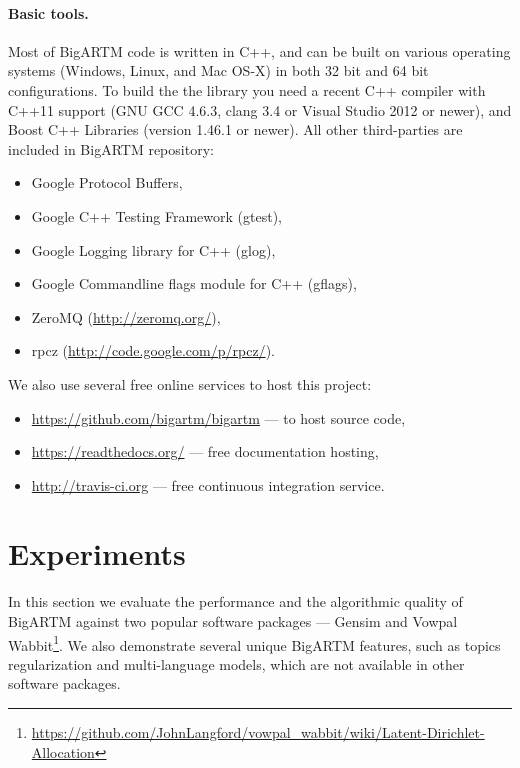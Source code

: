 \documentclass{llncs}
\begin{document}
\paragraph{Basic tools.}
Most of BigARTM code is written in C++,
and can be built on various operating systems (Windows, Linux, and Mac OS-X)
in both 32 bit and 64 bit configurations.
To build the the library you need a recent C++ compiler with C++11 support (GNU GCC 4.6.3, clang 3.4 or Visual Studio 2012 or newer),
and Boost C++ Libraries (version 1.46.1 or newer).
All other third-parties are included in BigARTM repository:
\begin{itemize}
\item Google Protocol Buffers,
\item Google C++ Testing Framework (gtest),
\item Google Logging library for C++ (glog),
\item Google Commandline flags module for C++ (gflags),
\item ZeroMQ (\url{http://zeromq.org/}),
\item rpcz (\url{http://code.google.com/p/rpcz/}).
\end{itemize}
We also use several free online services to host this project:
\begin{itemize}
\item \url{https://github.com/bigartm/bigartm} --- to host source code,
\item \url{https://readthedocs.org/} --- free documentation hosting,
\item \url{http://travis-ci.org} --- free continuous integration service.
\end{itemize}

\section{Experiments}
\label{sec:Experiments}

In this section we evaluate the performance and the algorithmic quality of \mbox{BigARTM} against two popular software packages ---
Gensim \cite{rehurek_lrec}  %
and Vowpal Wabbit\footnote{\url{https://github.com/JohnLangford/vowpal_wabbit/wiki/Latent-Dirichlet-Allocation}}.
We also demonstrate several unique BigARTM features, such as topics regularization and multi-language models,
which are not available in other software packages.
\end{document}
